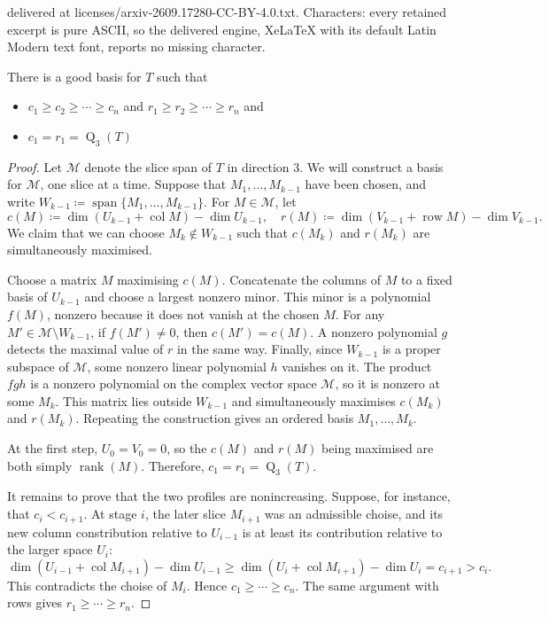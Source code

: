 \documentclass[10pt,a4paper]{amsart}
\DeclareMathOperator{\col}{col}
\DeclareMathOperator{\linspan}{span}
\DeclareMathOperator{\rank}{rank}
\DeclareMathOperator{\row}{row}
\DeclareMathOperator{\subrank}{Q}
\begin{document}
delivered at licenses/arxiv-2609.17280-CC-BY-4.0.txt. Characters: every retained excerpt is pure ASCII, so the delivered engine, XeLaTeX with its default Latin Modern text font, reports no missing character.
\begin{lemma}\label{lemma: existance of good basis}
	There is a good basis for $T$ such that
	\begin{itemize}
		\item $c_1 \geq c_2 \geq \cdots \geq c_n$ and $r_1 \geq r_2 \geq \cdots \geq r_n$ and
		\item $c_1 = r_1 = \subrank_3(T)$
	\end{itemize}
\end{lemma}

\begin{proof}
Let $\mathcal{M}$ denote the slice span of $T$ in direction 3.
We will construct a basis for $\mathcal{M}$, one slice at a time. Suppose that $M_1, \ldots, M_{k-1}$ have been chosen, and write $W_{k-1} \coloneqq \linspan \{M_1, \ldots, M_{k-1}\}$. For $M \in \mathcal{M}$, let 
\[
c(M) \coloneqq \dim(U_{k-1} + \col M) - \dim U_{k-1}, \quad r(M) \coloneqq \dim (V_{k-1} + \row M) - \dim V_{k-1}.
\]
We claim that we can choose $M_k \not\in W_{k-1}$ such that $c(M_k)$ and $r(M_k)$ are simultaneously maximised.

Choose a matrix $M$ maximising $c(M)$. Concatenate the columns of $M$ to a fixed basis of $U_{k-1}$ and choose a largest nonzero minor. This minor is a polynomial $f(M)$, nonzero because it does not vanish at the chosen $M$. For any $M' \in \mathcal{M}\setminus W_{k-1}$, if $f(M')\neq 0$, then $c(M') = c(M)$. A nonzero polynomial $g$ detects the maximal value of $r$ in the same way. Finally, since $W_{k-1}$ is a proper subspace of $\mathcal{M}$, some nonzero linear polynomial $h$ vanishes on it. The product $fgh$ is a nonzero polynomial on the complex vector space $\mathcal{M}$, so it is nonzero at some $M_k$. This matrix lies outside $W_{k-1}$ and simultaneously maximises $c(M_k)$ and $r(M_k)$. Repeating the construction gives an ordered basis $M_1, \ldots, M_k$.

At the first step, $U_0 = V_0 = 0$, so the $c(M)$ and $r(M)$ being maximised are both simply $\rank(M)$. Therefore, $c_1 = r_1 = \subrank_3(T)$. 

It remains to prove that the two profiles are nonincreasing. Suppose, for instance, that $c_i < c_{i+1}$. At stage $i$, the later slice $M_{i+1}$ was an admissible choise, and its new column constribution relative to $U_{i-1}$ is at least its contribution relative to the larger space $U_i$:
\[
\dim(U_{i-1} + \col M_{i+1}) - \dim U_{i-1} \geq \dim (U_i + \col M_{i+1}) - \dim U_i = c_{i+1} > c_i.
\]
This contradicts the choise of $M_i$. Hence $c_1\geq \cdots \geq c_n$. The same argument with rows gives $r_1 \geq \cdots \geq r_n$.
\end{proof}
\end{document}
